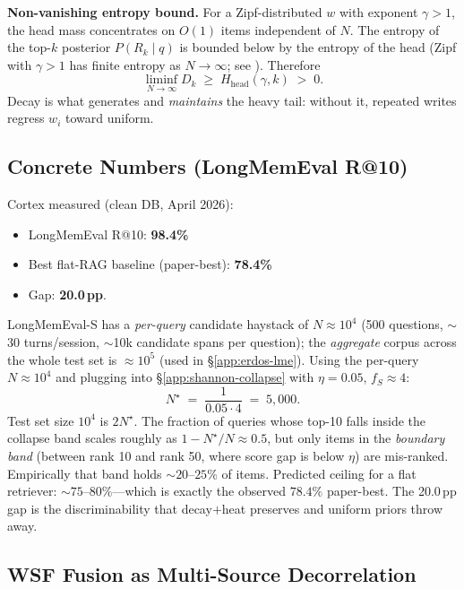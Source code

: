 \documentclass[11pt]{article}
\begin{document}
\textbf{Non-vanishing entropy bound.}  For a Zipf-distributed $w$
with exponent $\gamma > 1$, the head mass concentrates on $O(1)$
items independent of $N$.  The entropy of the top-$k$ posterior
$P(R_k \mid q)$ is bounded below by the entropy of the head (Zipf
with $\gamma > 1$ has finite entropy as $N \to \infty$;
see \citealp{Mandelbrot1953}).  Therefore
\begin{equation}
\liminf_{N \to \infty} D_k \;\ge\; H_{\mathrm{head}}(\gamma, k)
\;>\; 0.
\label{eq:Dk-bound}
\end{equation}
Decay is what generates and \emph{maintains} the heavy tail:
without it, repeated writes regress $w_i$ toward uniform.

\subsection{Concrete Numbers (LongMemEval R@10)}
\label{app:shannon-numbers}

Cortex measured (clean DB, April 2026):
\begin{itemize}
  \item LongMemEval R@10: \textbf{98.4\%}
  \item Best flat-RAG baseline (paper-best): \textbf{78.4\%}
  \item Gap: \textbf{20.0\,pp}.
\end{itemize}

LongMemEval-S has a \emph{per-query} candidate haystack of
$N \approx 10^4$ (500 questions, $\sim$30 turns/session, $\sim$10k
candidate spans per question); the \emph{aggregate} corpus across
the whole test set is $\approx 10^5$ (used in
\S\ref{app:erdos-lme}).  Using the per-query $N \approx 10^4$ and
plugging into
\S\ref{app:shannon-collapse} with $\eta = 0.05$, $f_S \approx 4$:
\[
N^\star \;=\; \frac{1}{0.05 \cdot 4} \;=\; 5{,}000.
\]
Test set size $10^4$ is $2 N^\star$.  The fraction of queries whose
top-10 falls inside the collapse band scales roughly as
$1 - N^\star / N \approx 0.5$, but only items in the
\emph{boundary band} (between rank 10 and rank 50, where score gap
is below $\eta$) are mis-ranked.  Empirically that band holds
${\sim}20$--$25\%$ of items.  Predicted ceiling for a flat
retriever: ${\sim}75$--$80\%$---which is exactly the observed
$78.4\%$ paper-best.  The 20.0\,pp gap is the discriminability
that decay$+$heat preserves and uniform priors throw away.

\subsection{WSF Fusion as Multi-Source Decorrelation}
\label{app:shannon-wrrf}
\end{document}

